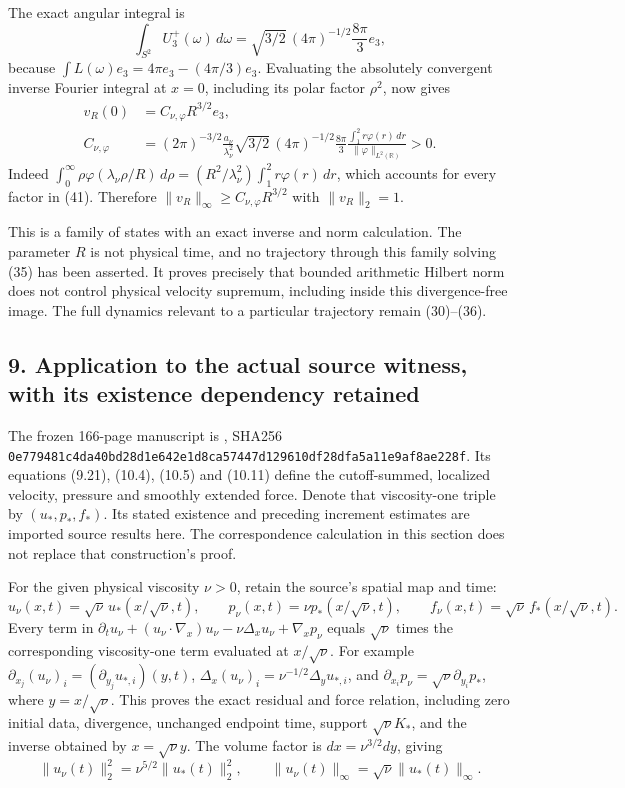 The exact angular integral is \[
\int_{S^2}U_3^+(\omega)\,d\omega
=\sqrt{3/2}\,(4\pi)^{-1/2}\frac{8\pi}{3}e_3,
\tag{40}
\] because \(\int L(\omega)e_3=4\pi e_3-(4\pi/3)e_3\). Evaluating the absolutely convergent inverse Fourier integral at \(x=0\), including its polar factor \(\rho^2\), now gives \[
\begin{aligned}
v_R(0)&=C_{\nu,\varphi}R^{3/2}e_3,\\
C_{\nu,\varphi}
&=(2\pi)^{-3/2}\frac{a_\nu}{\lambda_\nu^2}
\sqrt{3/2}\,(4\pi)^{-1/2}\frac{8\pi}{3}
\frac{\int_1^2r\varphi(r)\,dr}{\|\varphi\|_{L^2(\mathbb R)}}>0.
\end{aligned}
\tag{41}
\] Indeed \(\int_0^\infty\rho\varphi(\lambda_\nu\rho/R)\,d\rho
=(R^2/\lambda_\nu^2)\int_1^2r\varphi(r)\,dr\), which accounts for every factor in (41). Therefore \(\|v_R\|_\infty\ge C_{\nu,\varphi}R^{3/2}\) with \(\|v_R\|_2=1\).

This is a family of states with an exact inverse and norm calculation. The parameter \(R\) is not physical time, and no trajectory through this family solving (35) has been asserted. It proves precisely that bounded arithmetic Hilbert norm does not control physical velocity supremum, including inside this divergence-free image. The full dynamics relevant to a particular trajectory remain (30)--(36).

\subsection*{9. Application to the actual source witness, with its existence dependency retained}

The frozen 166-page manuscript is , SHA256 \texttt{0e779481c4da40bd28d1e642e1d8ca57447d129610df28dfa5a11e9af8ae228f}. Its equations (9.21), (10.4), (10.5) and (10.11) define the cutoff-summed, localized velocity, pressure and smoothly extended force. Denote that viscosity-one triple by \((u_*,p_*,f_*)\). Its stated existence and preceding increment estimates are imported source results here. The correspondence calculation in this section does not replace that construction's proof.

For the given physical viscosity \(\nu>0\), retain the source's spatial map and time: \[
u_\nu(x,t)=\sqrt\nu\,u_*(x/\sqrt\nu,t),\qquad
p_\nu(x,t)=\nu p_*(x/\sqrt\nu,t),\qquad
f_\nu(x,t)=\sqrt\nu\,f_*(x/\sqrt\nu,t).
\tag{42}
\] Every term in \(\partial_tu_\nu+(u_\nu\cdot\nabla_x)u_\nu-\nu\Delta_xu_\nu+\nabla_xp_\nu\) equals \(\sqrt\nu\) times the corresponding viscosity-one term evaluated at \(x/\sqrt\nu\). For example \(\partial_{x_j}(u_\nu)_i=(\partial_{y_j}u_{*,i})(y,t)\), \(\Delta_x(u_\nu)_i=\nu^{-1/2}\Delta_yu_{*,i}\), and \(\partial_{x_i}p_\nu=\sqrt\nu\partial_{y_i}p_*\), where \(y=x/\sqrt\nu\). This proves the exact residual and force relation, including zero initial data, divergence, unchanged endpoint time, support \(\sqrt\nu K_*\), and the inverse obtained by \(x=\sqrt\nu y\). The volume factor is \(dx=\nu^{3/2}dy\), giving \[
\|u_\nu(t)\|_2^2=\nu^{5/2}\|u_*(t)\|_2^2,
\qquad \|u_\nu(t)\|_\infty=\sqrt\nu\|u_*(t)\|_\infty.
\tag{43}
\]

